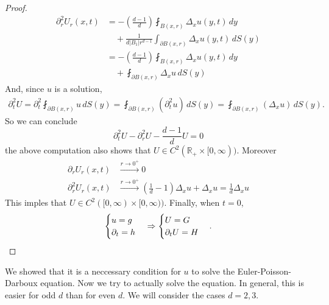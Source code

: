 \documentclass{report}
\theoremstyle{tommy}
\begin{document}
\begin{proof}
\begin{align*}
      \partial^2_r U_r(x,t) &= - \left(\frac{d-1}{d}\right) \fint_{B(x,r)} \Delta_x u(y,t) \, dy \\&\quad+ \frac{1}{d|B_1|r^{d-1}} \int_{\partial B(x,r)} \Delta_x u(y,t) \, dS(y) \\
      &= - \left(\frac{d-1}{d}\right) \fint_{B(x,r)} \Delta_x u(y,t) \, dy \\&\quad+ \fint_{\partial B(x,r)} \Delta_x u \, dS(y)
    \end{align*}
    And, since \(u\) is a solution,
    \begin{align*}
      \partial_t^2 U = \partial_t^2 \fint_{\partial B(x,r)} u\, dS(y) = \fint_{\partial B(x,r)} (\partial_t^2 u) \, dS(y) = \fint_{\partial B(x,r)} (\Delta_x u) \, dS(y).
    \end{align*}
    So we can conclude 
    \[\partial_t^2 U - \partial_r^2 U - \frac{d-1}{d} U = 0\]
    the above computation also shows that \(U \in C^2(\mathbb{R}_+ \times [0,\infty))\). Moreover 
    \begin{align*}
      \partial_r U_r(x,t) &\xrightarrow{r \to 0^+} 0 \\
      \partial^2_r U_r(x,t) &\xrightarrow{r \to 0^+} \left(\frac{1}{d} - 1\right) \Delta_x u + \Delta_x u = \frac{1}{d} \Delta_x u
    \end{align*}
    This imples that \(U \in C^2([0,\infty) \times [0,\infty))\). Finally, when \(t=0\),
    \[\begin{cases}
      u = g \\ \partial_t = h
    \end{cases} 
    \Rightarrow
    \begin{cases}
      U = G \\ \partial_t U = H
    \end{cases}. \qedhere\]
  \end{proof}

  We showed that it is a neccessary condition for \(u\) to solve the Euler-Poisson-Darboux equation. Now we try to actually solve the equation. In general, this is easier for odd \(d\) than for even \(d\). We will consider the cases \(d = 2,3\).
\end{document}
